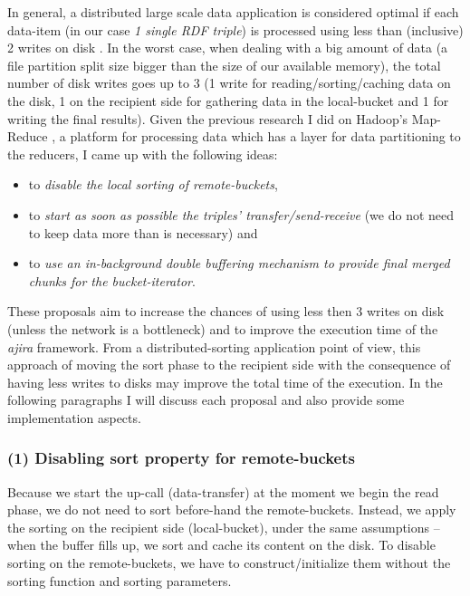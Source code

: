 In general, a distributed large scale data application is considered optimal if each data-item (in our case \textit{1 single RDF triple}) is processed using less than (inclusive) 2 writes on disk \cite{tritonsort}. In the worst case, when dealing with a big amount of data (a file partition split size bigger than the size of our available memory), the total number of disk writes goes up to 3 (1 write for reading/sorting/caching data on the disk, 1 on the recipient side for gathering data in the local-bucket and  1 for writing the final results). Given the previous research I did on Hadoop's Map-Reduce \cite{hadoop}, a platform for processing data which has a layer for data partitioning \cite{shuffling} to the reducers, I came up with the following ideas: 
\begin{itemize}
\item to \textit{disable the local sorting of remote-buckets},
\item to \textit{start as soon as possible the triples' transfer/send-receive} (we do not need to keep data more than is necessary) and
\item to \textit{use an in-background double buffering mechanism to provide final merged chunks for the bucket-iterator}. 
\end{itemize}

These proposals aim to increase the chances of using less then 3 writes on disk (unless the network is a bottleneck) and to improve the execution time of the \textit{ajira} framework. From a distributed-sorting application point of view, this approach of moving the sort phase to the recipient side with the consequence of having less writes to disks may improve the total time of the execution. In the following paragraphs I will discuss each proposal and also provide some implementation aspects.

% 
\subsubsection*{(1) Disabling sort property for remote-buckets}

Because we start the up-call (data-transfer) at the moment we begin the read phase, we do not need to sort before-hand the remote-buckets. Instead, we apply the sorting on the recipient side (local-bucket), under the same assumptions -- when the buffer fills up, we sort and cache its content on the disk. To disable sorting on the remote-buckets, we have to construct/initialize them without the sorting function and sorting parameters.


